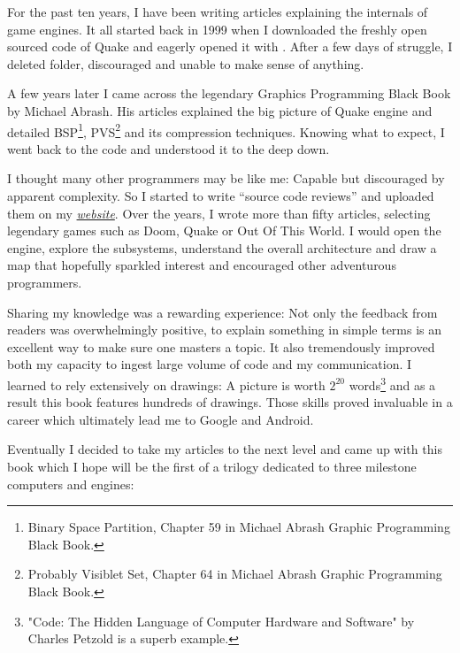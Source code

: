 \documentclass[book.tex]{subfiles}
\begin{document}
For the past ten years, I have been writing articles explaining the internals of game engines. It all started back in 1999 when I downloaded the freshly open sourced code of \mbox{Quake} and eagerly opened it with . After a few days of struggle, I deleted  folder, discouraged and unable to make sense of anything.

\bigskip

A few years later I came across the legendary Graphics Programming Black Book by Michael Abrash. His articles explained the big picture of Quake engine and detailed BSP\footnote{Binary Space Partition, Chapter 59 in Michael Abrash Graphic Programming Black Book.}, PVS\footnote{Probably Visiblet Set, Chapter 64 in Michael Abrash Graphic Programming Black Book.} and its compression techniques. Knowing what to expect, I went back to the code and understood it to the deep down.

\bigskip

I thought many other programmers may be like me: Capable but discouraged by apparent complexity. So I started to write ``source  code reviews'' and uploaded them on my
\href{http://fabiensanglard.net}{\textit{website}}. Over the years, I wrote more than fifty articles, selecting legendary games such as Doom, Quake or Out Of This World. I would open the engine, explore the subsystems, understand the overall architecture and draw a map that hopefully sparkled interest and encouraged other adventurous programmers.

\bigskip

Sharing my knowledge was a rewarding experience: Not only the feedback from readers was overwhelmingly positive, to explain something in simple terms is an excellent way to make sure one masters a topic. It also tremendously improved both my capacity to ingest large volume of code and my communication. I learned to rely extensively on drawings: A picture
is worth $2^{20}$ words\footnote{"Code: The Hidden Language of Computer Hardware and Software" by Charles Petzold is a superb example.} and as a result this book features hundreds of drawings. Those skills proved invaluable in a career which ultimately lead me to Google and Android.

\newpage

Eventually I decided to take my articles to the next level and came up with this book which I hope will be the first of a trilogy dedicated to three milestone computers and engines:
\end{document}
